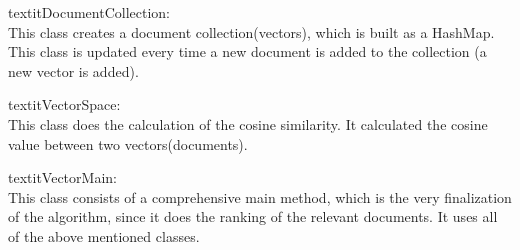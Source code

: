\begin{description}
\begin{description}
\item{textit{DocumentCollection: }}\\
This class creates a document collection(vectors), which is built as a HashMap. This class is updated every time a new document is added to the collection (a new vector is added).
\item{textit{VectorSpace: }}\\
This class does the calculation of the cosine similarity. It calculated the cosine value between two vectors(documents).
\item{textit{VectorMain: }}\\
This class consists of a comprehensive main method, which is the very finalization of the algorithm, since it does the ranking of the relevant documents. It uses all of the above mentioned classes.
\end{description}
\end{description}